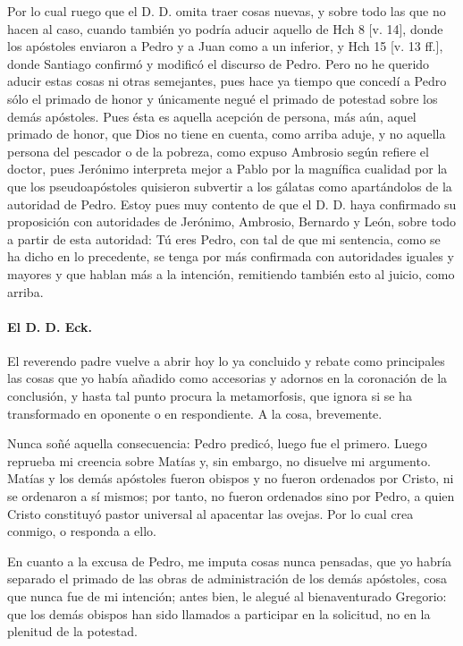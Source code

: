\marginpar{\small[320]} Por lo cual ruego que el D. D. omita traer cosas nuevas, y sobre todo las que no hacen al caso, cuando también yo podría aducir aquello de Hch 8 [v. 14], donde los apóstoles enviaron a Pedro y a Juan como a un inferior, y Hch 15 [v. 13 ff.], donde Santiago confirmó y modificó el discurso de Pedro. Pero no he querido aducir estas cosas ni otras semejantes, pues hace ya tiempo que concedí a Pedro sólo el primado de honor y únicamente negué el primado de potestad sobre los demás apóstoles. Pues ésta es aquella acepción de persona, más aún, aquel primado de honor, que Dios no tiene en cuenta, como arriba aduje, y no aquella persona del pescador o de la pobreza, como expuso Ambrosio según refiere el doctor, pues Jerónimo interpreta mejor a Pablo por la magnífica cualidad por la que los pseudoapóstoles quisieron subvertir a los gálatas como apartándolos de la autoridad de Pedro. Estoy pues muy contento de que el D. D. haya confirmado su proposición con autoridades de Jerónimo, Ambrosio, Bernardo y León, sobre todo a partir de esta autoridad: Tú eres Pedro, con tal de que mi sentencia, como se ha dicho en lo precedente, se tenga por más confirmada con autoridades iguales y mayores y que hablan más a la intención, remitiendo también esto al juicio, como arriba.

\paragraph*{El D. D. Eck.}

El reverendo padre vuelve a abrir hoy lo ya concluido y rebate como principales las cosas que yo había añadido como accesorias y adornos en la coronación de la conclusión, y hasta tal punto procura la metamorfosis, que ignora si se ha transformado en oponente o en respondiente. A la cosa, brevemente.

Nunca soñé aquella consecuencia: Pedro predicó, luego fue el primero. Luego reprueba mi creencia sobre Matías y, sin embargo, no disuelve mi argumento. Matías y los demás apóstoles fueron obispos y no fueron ordenados por Cristo, ni se ordenaron a sí mismos; por tanto, no fueron ordenados sino por Pedro, a quien Cristo constituyó pastor universal al apacentar las ovejas. Por lo cual crea conmigo, o responda a ello.

En cuanto a la excusa de Pedro, me imputa cosas nunca pensadas, que yo habría separado el primado de las obras de administración de los demás apóstoles, cosa que nunca fue de mi intención; antes bien, le alegué al bienaventurado Gregorio: que los demás obispos han sido llamados a participar en la solicitud, no en la plenitud de la potestad.

